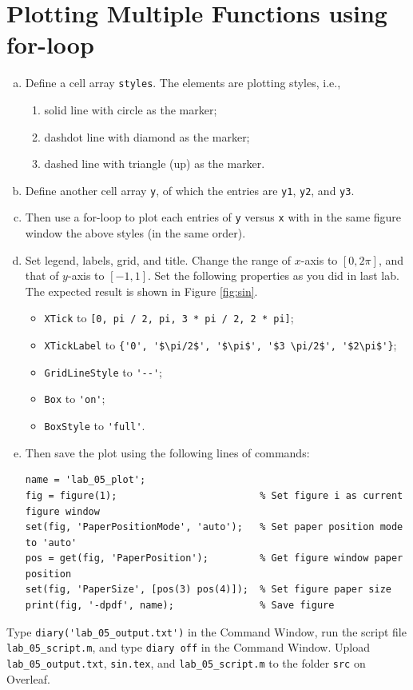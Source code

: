 \section{Plotting Multiple Functions using for-loop}
\begin{enumerate}[(a)]
    \item Define a cell array \verb|styles|. The elements are plotting styles, i.e.,
        \begin{enumerate}[(1)]
            \item solid line with circle as the marker;
            \item dashdot line with diamond as the marker;
            \item dashed line with triangle (up) as the marker.
        \end{enumerate}
    \item Define another cell array \verb|y|, of which the entries are \verb|y1|, \verb|y2|, and \verb|y3|.
    \item Then use a for-loop to plot each entries of \verb|y| versus \verb|x| with in the same figure window the above styles (in the same order).
    \item Set legend, labels, grid, and title. Change the range of $x$-axis to $[0, 2\pi]$, and that of $y$-axis to $[-1, 1]$. Set the following properties as you did in last lab. The expected result is shown in Figure \ref{fig:sin}.
    \begin{itemize}
        \item \verb|XTick| to \verb|[0, pi / 2, pi, 3 * pi / 2, 2 * pi]|;
        \item \verb|XTickLabel| to \verb|{'0', '$\pi/2$', '$\pi$', '$3 \pi/2$', '$2\pi$'}|;
        \item \verb|GridLineStyle| to \verb|'--'|;
        \item \verb|Box| to \verb|'on'|;
        \item \verb|BoxStyle| to \verb|'full'|.
    \end{itemize}
    \item Then save the plot using the following lines of commands:
        \begin{lstlisting}[style=MATLAB]
name = 'lab_05_plot';
fig = figure(1);                         % Set figure i as current figure window
set(fig, 'PaperPositionMode', 'auto');   % Set paper position mode to 'auto'
pos = get(fig, 'PaperPosition');         % Get figure window paper position
set(fig, 'PaperSize', [pos(3) pos(4)]);  % Set figure paper size
print(fig, '-dpdf', name);               % Save figure
        \end{lstlisting}
\end{enumerate}
Type \verb|diary('lab_05_output.txt')| in the Command Window, run the script file \verb|lab_05_script.m|, and type \verb|diary off| in the Command Window. Upload \verb|lab_05_output.txt|, \verb|sin.tex|, and \verb|lab_05_script.m| to the folder \verb|src| on Overleaf.

